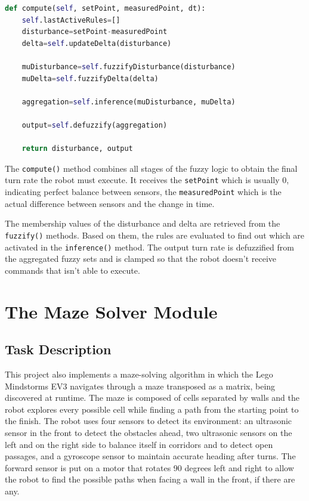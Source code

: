 \begin{lstlisting}[language=Python, caption={FuzzyRuleBasedAlgorithm compute method}, label={lst:lk-init}]
def compute(self, setPoint, measuredPoint, dt):
    self.lastActiveRules=[]
    disturbance=setPoint-measuredPoint
    delta=self.updateDelta(disturbance)
    
    muDisturbance=self.fuzzifyDisturbance(disturbance)
    muDelta=self.fuzzifyDelta(delta)
    
    aggregation=self.inference(muDisturbance, muDelta)
    
    output=self.defuzzify(aggregation)
    
    return disturbance, output
\end{lstlisting}

The \texttt{compute()} method combines all stages of the fuzzy logic to obtain the final turn rate the robot must execute. It receives the \texttt{setPoint} which is usually 0, indicating perfect balance between sensors, the \texttt{measuredPoint} which is the actual difference between sensors and the change in time.

The membership values of the disturbance and delta are retrieved from the \texttt{fuzzify()} methods. Based on them, the rules are evaluated to find out which are activated in the \texttt{inference()} method. The output turn rate is defuzzified from the aggregated fuzzy sets and is clamped so that the robot doesn’t receive commands that isn’t able to execute.

\section{The Maze Solver Module}
\label{sec:maze-solver}

\subsection{Task Description}
\label{sec:ms-task}

This project also implements a maze-solving algorithm in which the Lego Mindstorms EV3 navigates through a maze transposed as a matrix, being discovered at runtime. The maze is composed of cells separated by walls and the robot explores every possible cell while finding a path from the starting point to the finish. The robot uses four sensors to detect its environment: an ultrasonic sensor in the front to detect the obstacles ahead, two ultrasonic sensors on the left and on the right side to balance itself in corridors and to detect open passages, and a gyroscope sensor to maintain accurate heading after turns. The forward sensor is put on a motor that rotates 90 degrees left and right to allow the robot to find the possible paths when facing a wall in the front, if there are any.

